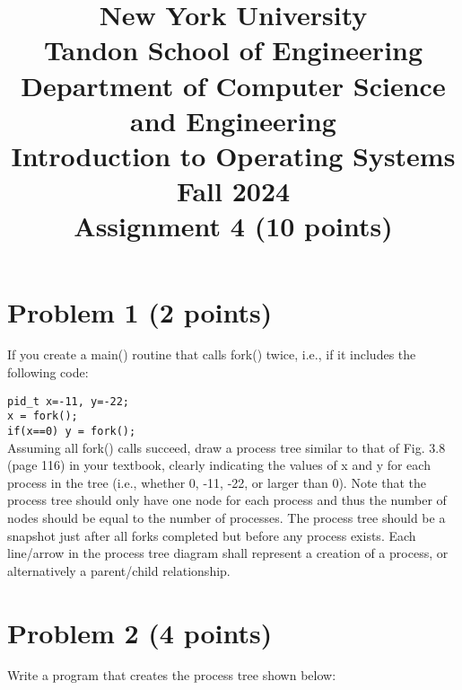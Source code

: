\documentclass{article}
\title{New York University \\ Tandon School of Engineering \\ Department of Computer Science and Engineering \\ Introduction to Operating Systems \\ Fall 2024 \\ Assignment 4 (10 points)}
\author{}
\date{}
\begin{document}
\maketitle

\section*{Problem 1 (2 points)}

If you create a main() routine that calls fork() twice, i.e., if it includes the following code:

\texttt{pid\_t x=-11, y=-22;}\\
\texttt{x = fork();}\\
\texttt{if(x==0) y = fork();}\\

Assuming all fork() calls succeed, draw a process tree similar to that of Fig. 3.8 (page 116) in your textbook, clearly indicating the values of x and y for each process in the tree (i.e., whether 0, -11, -22, or larger than 0). Note that the process tree should only have one node for each process and thus the number of nodes should be equal to the number of processes. The process tree should be a snapshot just after all forks completed but before any process exists. Each line/arrow in the process tree diagram shall represent a creation of a process, or alternatively a parent/child relationship.

\begin{center}
\end{center}


\section*{Problem 2 (4 points)}

Write a program that creates the process tree shown below:

\begin{center}
\end{center}
\end{document}
